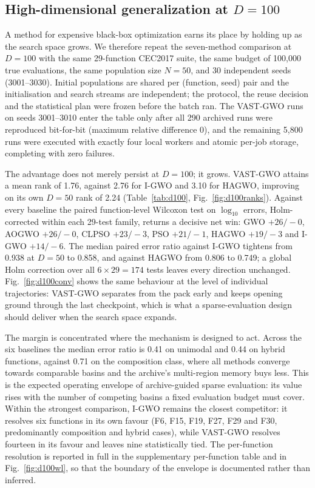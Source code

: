 \subsection{High-dimensional generalization at $D=100$}
\label{sec:d100}

A method for expensive black-box optimization earns its place by holding up as
the search space grows. We therefore repeat the seven-method comparison at
$D=100$ with the same 29-function CEC2017 suite, the same budget of 100{,}000
true evaluations, the same population size $N=50$, and 30 independent seeds
(3001--3030). Initial populations are shared per (function, seed) pair and the
initialisation and search streams are independent; the protocol, the reuse
decision and the statistical plan were frozen before the batch ran. The
VAST-GWO runs on seeds 3001--3010 enter the table only after all 290 archived
runs were reproduced bit-for-bit (maximum relative difference $0$), and the
remaining 5{,}800 runs were executed with exactly four local workers and
atomic per-job storage, completing with zero failures.

The advantage does not merely persist at $D=100$; it grows. VAST-GWO attains
a mean rank of 1.76, against 2.76 for I-GWO and 3.10 for HAGWO, improving on
its own $D=50$ rank of 2.24 (Table~\ref{tab:d100}, Fig.~\ref{fig:d100ranks}).
Against every baseline the paired function-level Wilcoxon test on
$\log_{10}$ errors, Holm-corrected within each 29-test family, returns a
decisive net win: GWO $+26/-0$, AOGWO $+26/-0$, CLPSO $+23/-3$, PSO
$+21/-1$, HAGWO $+19/-3$ and I-GWO $+14/-6$. The median paired error ratio
against I-GWO tightens from 0.938 at $D=50$ to 0.858, and against HAGWO from
0.806 to 0.749; a global Holm correction over all $6\times29=174$ tests leaves
every direction unchanged. Fig.~\ref{fig:d100conv} shows the same behaviour at the level of individual
trajectories: VAST-GWO separates from the pack early and keeps opening ground
through the last checkpoint, which is what a sparse-evaluation design should
deliver when the search space expands.

The margin is concentrated where the mechanism is designed to act. Across the
six baselines the median error ratio is 0.41 on unimodal and 0.44 on hybrid
functions, against 0.71 on the composition class, where all methods converge
towards comparable basins and the archive's multi-region memory buys less.
This is the expected operating envelope of archive-guided sparse evaluation:
its value rises with the number of competing basins a fixed evaluation budget
must cover. Within the strongest comparison, I-GWO remains the closest
competitor: it resolves six functions in its own favour (F6, F15, F19, F27,
F29 and F30, predominantly composition and hybrid cases), while VAST-GWO
resolves fourteen in its favour and leaves nine statistically tied. The per-function resolution is reported in full in the supplementary
per-function table and in Fig.~\ref{fig:d100wl}, so that the boundary of the
envelope is documented rather than inferred.

